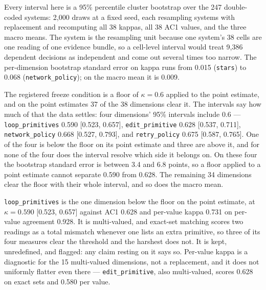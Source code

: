 Every interval here is a 95\% percentile cluster bootstrap over the 247 double-coded systems: 2,000
draws at a fixed seed, each resampling systems with replacement and recomputing all 38 kappas, all
38 AC1 values, and the three macro means. The system is the resampling unit because one system's 38
cells are one reading of one evidence bundle, so a cell-level interval would treat 9,386 dependent
decisions as independent and come out several times too narrow. The per-dimension bootstrap standard
error on kappa runs from 0.015 (\texttt{stars}) to 0.068 (\texttt{network\_policy}); on the macro
mean it is 0.009.

The registered freeze condition is a floor of $\kappa = 0.6$ applied to the point estimate, and on
the point estimates 37 of the 38 dimensions clear it. The intervals say how much of that the data
settles: four dimensions' 95\% intervals include 0.6 --- \texttt{loop\_primitives} 0.590
[0.523, 0.657], \texttt{edit\_primitive} 0.628 [0.537, 0.711], \texttt{network\_policy} 0.668
[0.527, 0.793], and \texttt{retry\_policy} 0.675 [0.587, 0.765]. One of the four is below the floor
on its point estimate and three are above it, and for none of the four does the interval resolve
which side it belongs on. On these four the bootstrap standard error is between 3.4 and 6.8 points,
so a floor applied to a point estimate cannot separate 0.590 from 0.628. The remaining 34 dimensions
clear the floor with their whole interval, and so does the macro mean.

\texttt{loop\_primitives} is the one dimension below the floor on the point estimate, at
$\kappa = 0.590$ [0.523, 0.657] against AC1 0.628 and per-value kappa
0.731 on per-value agreement 0.928. It is multi-valued, and exact-set matching scores two
readings as a total mismatch whenever one lists an extra primitive, so three of its four measures
clear the threshold and the harshest does not. It is kept, unredefined, and flagged: any claim
resting on it says so. Per-value kappa is a diagnostic for the 15 multi-valued dimensions, not a
replacement, and it does not uniformly flatter even there --- \texttt{edit\_primitive}, also
multi-valued, scores 0.628 on exact sets and 0.580 per value.

